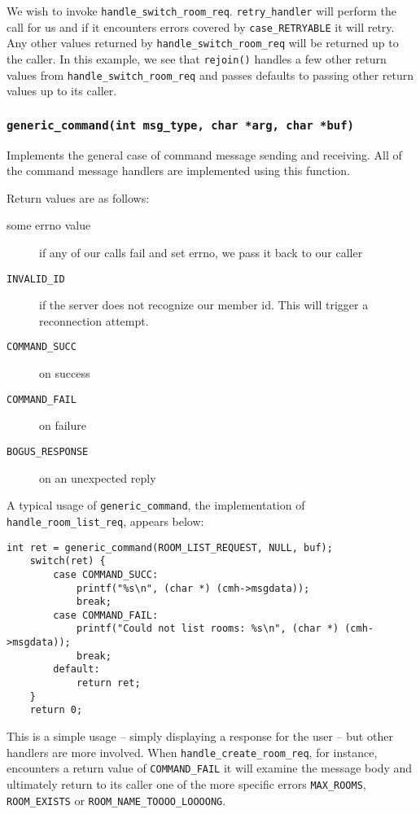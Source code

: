\documentclass[12pt]{article}
\newcommand{\mono}[1]{\texttt{#1}}
\begin{document}
We wish to invoke \mono{handle\_switch\_room\_req}.
\mono{retry\_handler} will perform the call for us and if it encounters errors
covered by \mono{case\_RETRYABLE} it will retry. Any other values
returned by \mono{handle\_switch\_room\_req} will be returned up to
the caller. In this example, we see that \mono{rejoin()} handles a
few other return values from \mono{handle\_switch\_room\_req} and passes
defaults to passing other return values up to its caller.


\subsubsection[\mono{generic\_command}]{\mono{generic\_command(int msg\_type, char *arg, char *buf)}}
Implements the general case of command message sending and receiving. All of
the command message handlers are implemented using this function. 

Return values are as follows:
\begin{description}
    \item[some errno value] if any of our calls fail and set errno, we pass it back to our caller
    \item[\mono{INVALID\_ID}] if the server does not recognize our member id. This
    will trigger a reconnection attempt.
    \item[\mono{COMMAND\_SUCC}] on success
    \item[\mono{COMMAND\_FAIL}] on failure
    \item[\mono{BOGUS\_RESPONSE}] on an unexpected reply
\end{description}

A typical usage of \mono{generic\_command}, the implementation of
\mono{handle\_room\_list\_req}, appears below:
\begin{lstlisting}[caption=handle\_room\_list\_req()]
    int ret = generic_command(ROOM_LIST_REQUEST, NULL, buf);
    switch(ret) {
        case COMMAND_SUCC:
            printf("%s\n", (char *) (cmh->msgdata));
            break;
        case COMMAND_FAIL:
            printf("Could not list rooms: %s\n", (char *) (cmh->msgdata));
            break;
        default:
            return ret;
    }
    return 0;
\end{lstlisting}

This is a simple usage -- simply displaying a response for the user
-- but other handlers are more involved. When
\mono{handle\_create\_room\_req}, for instance, encounters a return value
of \mono{COMMAND\_FAIL} it will examine the message body and ultimately
return to its caller one of the more specific errors \mono{MAX\_ROOMS},
\mono{ROOM\_EXISTS} or \mono{ROOM\_NAME\_TOOOO\_LOOOONG}.
\end{document}
